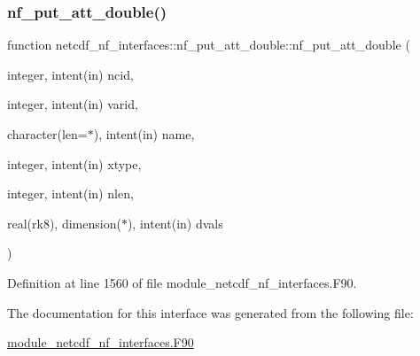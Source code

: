 \subsubsection{\texorpdfstring{nf\+\_\+put\+\_\+att\+\_\+double()}{nf\_put\_att\_double()}}
{\footnotesize\ttfamily function netcdf\+\_\+nf\+\_\+interfaces\+::nf\+\_\+put\+\_\+att\+\_\+double\+::nf\+\_\+put\+\_\+att\+\_\+double (\begin{DoxyParamCaption}\item[{integer, intent(in)}]{ncid,  }\item[{integer, intent(in)}]{varid,  }\item[{character(len=$\ast$), intent(in)}]{name,  }\item[{integer, intent(in)}]{xtype,  }\item[{integer, intent(in)}]{nlen,  }\item[{real(rk8), dimension($\ast$), intent(in)}]{dvals }\end{DoxyParamCaption})}



Definition at line 1560 of file module\+\_\+netcdf\+\_\+nf\+\_\+interfaces.\+F90.



The documentation for this interface was generated from the following file\+:\begin{DoxyCompactItemize}
\item 
\hyperlink{module__netcdf__nf__interfaces_8F90}{module\+\_\+netcdf\+\_\+nf\+\_\+interfaces.\+F90}\end{DoxyCompactItemize}
